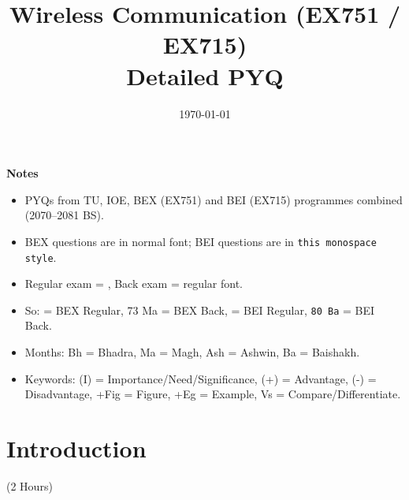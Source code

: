 \documentclass[12pt]{article}
\title{Wireless Communication (EX751 / EX715)\\[0.4em]\large Detailed PYQ}
\author{}
\date{\today}
\begin{document}
\maketitle
\vspace{6cm}
\textbf{Notes}
\begin{itemize}[noitemsep]
  \item PYQs from TU, IOE, BEX (EX751) and BEI (EX715) programmes combined (2070--2081 BS).
  \item BEX questions are in normal font; BEI questions are in \texttt{this monospace style}.
  \item Regular exam = , Back exam = regular font.
  \item So:  = BEX Regular, 73 Ma = BEX Back,  = BEI Regular, \texttt{80 Ba} = BEI Back.
  \item Months: Bh = Bhadra, Ma = Magh, Ash = Ashwin, Ba = Baishakh.
  \item Keywords: (I) = Importance/Need/Significance, (+) = Advantage, (-) = Disadvantage, +Fig = Figure, +Eg = Example, Vs = Compare/Differentiate.
\end{itemize}
\pagebreak
\tableofcontents
\pagebreak

\section{Introduction}
\begin{center}(2 Hours)\end{center}
\end{document}
